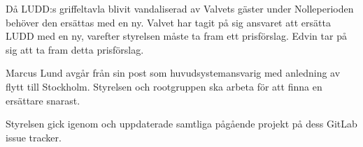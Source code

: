 \documentclass{protokoll}
\begin{document}
Då LUDD:s griffeltavla blivit vandaliserad av Valvets gäster under Nolleperioden behöver den ersättas med en ny. Valvet har tagit på sig ansvaret att ersätta LUDD med en ny, varefter styrelsen måste ta fram ett prisförslag. 
Edvin tar på sig att ta fram detta prisförslag. 

Marcus Lund avgår från sin post som huvudsystemansvarig med anledning av flytt till Stockholm. Styrelsen och rootgruppen ska arbeta för att finna en ersättare snarast. 

Styrelsen gick igenom och uppdaterade samtliga pågående projekt på dess GitLab issue tracker.
\end{document}
